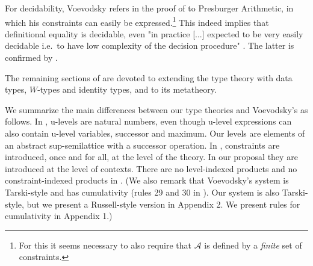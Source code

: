 \documentclass[11pt,a4paper]{article}
\theoremstyle{definition}
\newcommand{\AFu}{\mathcal{A}}
\begin{document}
For decidability, Voevodsky refers in the proof of
\cite[Lemma 2.0.4, proof]{VV} to Presburger Arithmetic,
in which his constraints can easily be expressed.\footnote{%
For this it seems necessary to also require that $\AFu$
is defined by a \emph{finite} set of constraints.}%
This indeed implies that definitional equality is decidable, even
"in practice [...] expected to be very easily decidable i.e.\
to have low complexity of the decision procedure"
\cite[p.\ 5, l.\ -13]{VV}.
The latter is confirmed by \cite{bezem-coquand:lattices}.

The remaining sections of \cite{VV} are devoted to extending the
type theory with data types, $W$-types and identity types,
and to its metatheory.

We summarize the main differences between our type theories
and Voevodsky's as follows.
%
In \cite{VV}, u-levels are natural numbers, even though u-level
expressions can also contain u-level variables, successor and maximum.
Our levels are elements of an abstract sup-semilattice with a successor
operation.
%
In \cite{VV}, constraints are introduced, once and for all,
at the level of the theory. In our proposal they are introduced
at the level of contexts.
There are no level-indexed products and no constraint-indexed products in \cite{VV}.
%
%
(We also remark that Voevodsky's system is Tarski-style and has cumulativity (rules 29 and 30 in \cite[Section 3.4]{VV}). Our system is also Tarski-style, but we present a Russell-style version in Appendix 2. We present rules for cumulativity in Appendix 1.)




\end{document}

